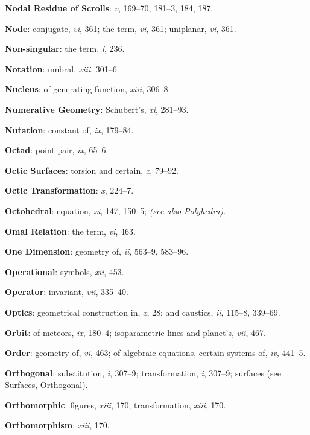 \documentclass[11pt,a4paper]{article}
\newcommand{\IndexEntry}[1]{\textbf{#1}}
\newcommand{\SeeAlso}[1]{\textit{(see also #1)}}
\newcommand{\V}[1]{\textit{#1}} %
\begin{document}
\newpage

\setcounter{page}{114}

\IndexEntry{Nodal Residue of Scrolls}: \V{v}, 169--70, 181--3, 184, 187.

\IndexEntry{Node}: conjugate, \V{vi}, 361; the term, \V{vi}, 361; uniplanar, \V{vi}, 361.

\IndexEntry{Non-singular}: the term, \V{i}, 236.

\IndexEntry{Notation}: umbral, \V{xiii}, 301--6.

\IndexEntry{Nucleus}: of generating function, \V{xiii}, 306--8.

\IndexEntry{Numerative Geometry}: Schubert's, \V{xi}, 281--93.

\IndexEntry{Nutation}: constant of, \V{ix}, 179--84.

\IndexEntry{Octad}: point-pair, \V{ix}, 65--6.

\IndexEntry{Octic Surfaces}: torsion and certain, \V{x}, 79--92.

\IndexEntry{Octic Transformation}: \V{x}, 224--7.

\IndexEntry{Octohedral}: equation, \V{xi}, 147, 150--5; \SeeAlso{Polyhedra}.

\IndexEntry{Omal Relation}: the term, \V{vi}, 463.

\IndexEntry{One Dimension}: geometry of, \V{ii}, 563--9, 583--96.

\IndexEntry{Operational}: symbols, \V{xii}, 453.

\IndexEntry{Operator}: invariant, \V{vii}, 335--40.

\IndexEntry{Optics}: geometrical construction in, \V{x}, 28; and caustics, \V{ii}, 115--8, 339--69.

\IndexEntry{Orbit}: of meteors, \V{ix}, 180--4; isoparametric lines and planet's, \V{vii}, 467.

\IndexEntry{Order}: geometry of, \V{vi}, 463; of algebraic equations, certain systems of, \V{iv}, 441--5.

\IndexEntry{Orthogonal}: substitution, \V{i}, 307--9; transformation, \V{i}, 307--9; surfaces (see Surfaces, Orthogonal).

\IndexEntry{Orthomorphic}: figures, \V{xiii}, 170; transformation, \V{xiii}, 170.

\IndexEntry{Orthomorphism}: \V{xiii}, 170.
\end{document}
